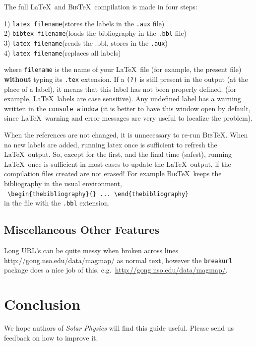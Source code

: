 \documentclass[namedreferences,hyperref,optionalrh]{spr-sola}
\newcommand{\BibTeX}{\textsc{Bib}\TeX}
\begin{document}
   The full \LaTeX\ and \BibTeX\ compilation is made in four steps: 
\begin{tabbing}
1) {\tt latex filename}\qquad\qquad\=(stores the labels in the {\tt .aux} file)\\
2) {\tt bibtex filename}\>(loads the bibliography in the {\tt .bbl} file)\\
3) {\tt latex filename}\>(reads the .bbl, stores in the {\tt .aux})\\
4) {\tt latex filename}\>(replaces all labels)  
\end{tabbing}
   where \texttt{filename} is the name of your \LaTeX\ file (for example, 
the present file) {\bf without} typing its \texttt{.tex} extension.
If a \texttt{(?)} is still present in the output (at the place of a label),
it means that this label has not been properly defined. 
 (for example, \LaTeX\ labels are case sensitive).
Any undefined label has a warning written in the \texttt{console window}
(it is better to have this window open by default, since \LaTeX\ warning and 
error messages are very useful to localize the problem).

  When the references are not changed, it is unnecessary to re-run \BibTeX .
When no new labels are added, running latex once is sufficient to refresh
the \LaTeX\ output. So, except for
the first, and the final time (safest), running \LaTeX\ once is sufficient
in most cases to update the \LaTeX\ output, if the compilation files 
created are not erased! For example \BibTeX\ keeps the bibliography in the usual 
environment,\\
  \verb+ \begin{thebibliography}{} ... \end{thebibliography}+\\
in the file with the \verb+.bbl+ extension.  

\subsection{Miscellaneous Other Features} %
\label{S-Miscellaneous} 
Long URL's can be quite messy when broken across lines
\textrm{http://gong.nso.edu/data/magmap/} as normal text,
however the \texttt{breakurl} package does a nice job of this, 
e.g.~\url{http://gong.nso.edu/data/magmap/}.
   
\section{Conclusion} %
\label{S-Conclusion} 
      We hope authors of {\it Solar Physics} will find this guide useful.
Please send us feedback on how to improve it.
      
\end{document}
